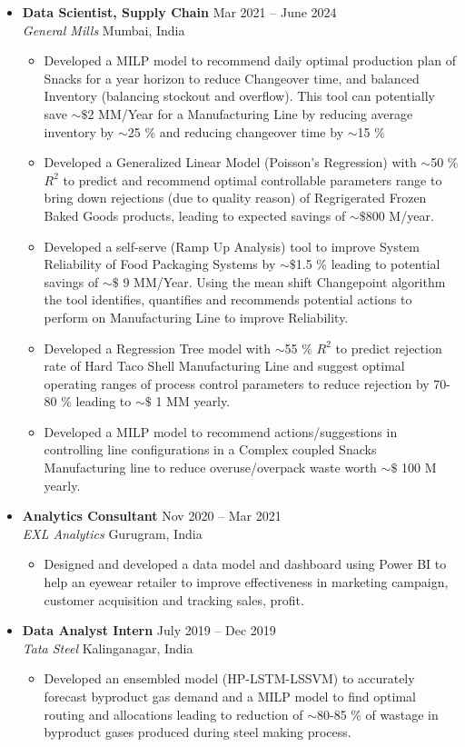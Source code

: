 \documentclass[a4paper,10pt]{article}
\newcommand{\resumeItem}[1]{\item\small{#1}}
\newcommand{\resumeSubheading}[4]{
  \vspace{1pt}\item
    \textbf{#1} \hfill {#2} \\
    \emph{#3} \hfill {#4} \\
}
\begin{document}
\begin{itemize}
    \resumeSubheading
      {Data Scientist, Supply Chain}{Mar 2021 -- June 2024}
      {General Mills}{Mumbai, India}
      \begin{itemize}
          \resumeItem{
            Developed a MILP model to recommend daily optimal production plan of Snacks for a year horizon to reduce Changeover time, 
            and balanced Inventory (balancing stockout and overflow). This tool can potentially save $\sim\$$2 MM/Year for a 
            Manufacturing Line by reducing average inventory by $\sim$25 \%
            and reducing changeover time by $\sim$15 \%
          }
          \resumeItem{
            Developed a Generalized Linear Model (Poisson's Regression) with $\sim$50 \% $R^2$ to predict and recommend optimal controllable 
            parameters range to bring down rejections (due to quality reason) of Regrigerated Frozen Baked Goods products, leading to expected 
            savings of $\sim\$$800 M/year. 
          }
          \resumeItem{
            Developed  a self-serve (Ramp Up Analysis) tool to improve System Reliability of Food Packaging Systems by
            $\sim\$$1.5 \% leading to potential savings of $\sim\$$ 9 MM/Year. Using the mean shift Changepoint algorithm the tool identifies,
            quantifies and recommends potential actions to perform on Manufacturing Line to improve Reliability.
          }
          \resumeItem{
            Developed a Regression Tree model with $\sim$55 \% $R^2$ to predict rejection rate of Hard Taco Shell Manufacturing Line and suggest
            optimal operating ranges of process control parameters to reduce rejection by 70-80 \% leading to $\sim\$$ 1 MM
            yearly.
          }
          \resumeItem{
            Developed a MILP model to recommend actions/suggestions in controlling line configurations in a Complex coupled
            Snacks Manufacturing line to reduce overuse/overpack waste worth $\sim\$$ 100 M yearly.
          }
      \end{itemize}
    
    \resumeSubheading
      {Analytics Consultant}{Nov 2020 -- Mar 2021}
      {EXL Analytics}{Gurugram, India}
      \begin{itemize}
          \resumeItem{
            Designed and developed a data model and dashboard using Power BI to help an eyewear retailer to improve 
            effectiveness in marketing campaign, customer acquisition and tracking sales, profit.
          }
      \end{itemize}

    \resumeSubheading
      {Data Analyst Intern}{July 2019 -- Dec 2019}
      {Tata Steel}{Kalinganagar, India}
      \begin{itemize}
          \resumeItem{
            Developed an ensembled model (HP-LSTM-LSSVM) to accurately forecast byproduct gas demand and a MILP model to find optimal 
            routing and allocations leading to reduction of $\sim$80-85 \% of wastage in byproduct gases produced during 
            steel making process.
          }
      \end{itemize}
\end{itemize}
\end{document}

